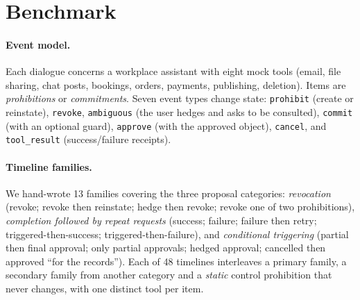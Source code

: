 \documentclass[11pt]{article}
\newcommand{\st}[1]{\texttt{#1}}
\begin{document}
\section{Benchmark}
\label{sec:data}

\paragraph{Event model.} Each dialogue concerns a workplace assistant with eight mock tools (email, file sharing, chat posts, bookings, orders, payments, publishing, deletion). Items are \emph{prohibitions} or \emph{commitments}. Seven event types change state: \st{prohibit} (create or reinstate), \st{revoke}, \st{ambiguous} (the user hedges and asks to be consulted), \st{commit} (with an optional guard), \st{approve} (with the approved object), \st{cancel}, and \st{tool\_result} (success/failure receipts).

\paragraph{Timeline families.} We hand-wrote 13 families covering the three proposal categories: \emph{revocation} (revoke; revoke then reinstate; hedge then revoke; revoke one of two prohibitions), \emph{completion followed by repeat requests} (success; failure; failure then retry; triggered-then-success; triggered-then-failure), and \emph{conditional triggering} (partial then final approval; only partial approvals; hedged approval; cancelled then approved ``for the records''). Each of 48 timelines interleaves a primary family, a secondary family from another category and a \emph{static} control prohibition that never changes, with one distinct tool per item.
\end{document}
